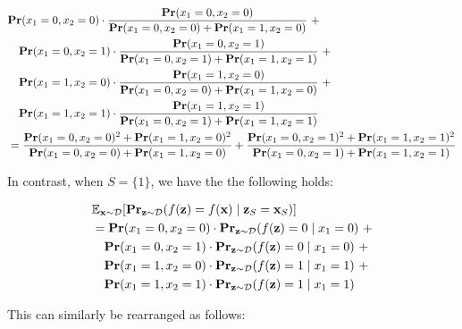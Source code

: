 \documentclass{article}
\newcommand{\z}{\textbf{z}}
\newcommand{\x}{\textbf{x}}
\newcommand{\mbf}[1]{\ensuremath\mathbf{#1}}
\newcommand{\mbb}[1]{\ensuremath\mathbb{#1}}
\begin{document}
\begin{equation*}
\begin{aligned}
& \mbf{Pr}(x_1 = 0, x_2 = 0) \cdot \frac{\mbf{Pr}(x_1 = 0, x_2 = 0)}{\mbf{Pr}(x_1 = 0, x_2 = 0) + \mbf{Pr}(x_1 = 1, x_2 = 0)} \ + \\
&\hspace{1em} \mbf{Pr}(x_1 = 0, x_2 = 1) \cdot \frac{\mbf{Pr}(x_1 = 0, x_2 = 1)}{\mbf{Pr}(x_1 = 0, x_2 = 1) + \mbf{Pr}(x_1 = 1, x_2 = 1)} \ + \\
&\hspace{1em} \mbf{Pr}(x_1 = 1, x_2 = 0) \cdot \frac{\mbf{Pr}(x_1 = 1, x_2 = 0)}{\mbf{Pr}(x_1 = 0, x_2 = 0) + \mbf{Pr}(x_1 = 1, x_2 = 0)} \ + \\
&\hspace{1em} \mbf{Pr}(x_1 = 1, x_2 = 1) \cdot \frac{\mbf{Pr}(x_1 = 1, x_2 = 1)}{\mbf{Pr}(x_1 = 0, x_2 = 1) + \mbf{Pr}(x_1 = 1, x_2 = 1)} \\
%
&= \frac{\mbf{Pr}(x_1 = 0, x_2 = 0)^2 + \mbf{Pr}(x_1 = 1, x_2 = 0)^2}{\mbf{Pr}(x_1 = 0, x_2 = 0) + \mbf{Pr}(x_1 = 1, x_2 = 0)} + 
\frac{\mbf{Pr}(x_1 = 0, x_2 = 1)^2 + \mbf{Pr}(x_1 = 1, x_2 = 1)^2}{\mbf{Pr}(x_1 = 0, x_2 = 1) + \mbf{Pr}(x_1 = 1, x_2 = 1)}
%
\end{aligned}
\end{equation*}


In contrast, when $S = \{1\}$, we have the the following holds:

\begin{equation*}
\begin{aligned}
&\mbb{E}_{\x\sim \mathcal{D}}[\mbf{Pr}_{\z\sim \mathcal{D}}(f(\z) = f(\x) \mid \z_{S} = \x_{S})] \\
&= \mbf{Pr}(x_1 = 0, x_2 = 0) \cdot \mbf{Pr}_{\z\sim \mathcal{D}}(f(\z) = 0 \mid x_1 = 0) \ + \\
&\hspace{1em} \mbf{Pr}(x_1 = 0, x_2 = 1) \cdot \mbf{Pr}_{\z\sim \mathcal{D}}(f(\z) = 0 \mid x_1 = 0) \ + \\
&\hspace{1em} \mbf{Pr}(x_1 = 1, x_2 = 0) \cdot \mbf{Pr}_{\z\sim \mathcal{D}}(f(\z) = 1 \mid x_1 = 1) \ + \\
&\hspace{1em} \mbf{Pr}(x_1 = 1, x_2 = 1) \cdot \mbf{Pr}_{\z\sim \mathcal{D}}(f(\z) = 1 \mid x_1 = 1) \\
\end{aligned}
\end{equation*}

This can similarly be rearranged as follows:
\end{document}
